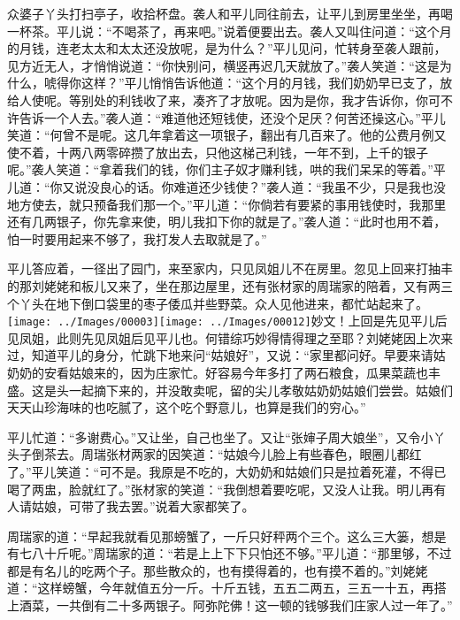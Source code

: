众婆子丫头打扫亭子，收拾杯盘。袭人和平儿同往前去，让平儿到房里坐坐，再喝一杯茶。平儿说：``不喝茶了，再来吧。''说着便要出去。袭人又叫住问道：``这个月的月钱，连老太太和太太还没放呢，是为什么？''平儿见问，忙转身至袭人跟前，见方近无人，才悄悄说道：``你快别问，横竖再迟几天就放了。''袭人笑道：``这是为什么，唬得你这样？''平儿悄悄告诉他道：``这个月的月钱，我们奶奶早已支了，放给人使呢。等别处的利钱收了来，凑齐了才放呢。因为是你，我才告诉你，你可不许告诉一个人去。''袭人道：``难道他还短钱使，还没个足厌？何苦还操这心。''平儿笑道：``何曾不是呢。这几年拿着这一项银子，翻出有几百来了。他的公费月例又使不着，十两八两零碎攒了放出去，只他这梯己利钱，一年不到，上千的银子呢。''袭人笑道：``拿着我们的钱，你们主子奴才赚利钱，哄的我们呆呆的等着。''平儿道：``你又说没良心的话。你难道还少钱使？''袭人道：``我虽不少，只是我也没地方使去，就只预备我们那一个。''平儿道：``你倘若有要紧的事用钱使时，我那里还有几两银子，你先拿来使，明儿我扣下你的就是了。''袭人道：``此时也用不着，怕一时要用起来不够了，我打发人去取就是了。''

平儿答应着，一径出了园门，来至家内，只见凤姐儿不在房里。忽见上回来打抽丰的那刘姥姥和板儿又来了，坐在那边屋里，还有张材家的周瑞家的陪着，又有两三个丫头在地下倒口袋里的枣子倭瓜并些野菜。众人见他进来，都忙站起来了。{\texttt{[image: ../Images/00003]}\texttt{[image: ../Images/00012]}\footnotesize \kaishu 妙文！上回是先见平儿后见凤姐，此则先见凤姐后见平儿也。何错综巧妙得情得理之至耶？}刘姥姥因上次来过，知道平儿的身分，忙跳下地来问``姑娘好''，又说：``家里都问好。早要来请姑奶奶的安看姑娘来的，因为庄家忙。好容易今年多打了两石粮食，瓜果菜蔬也丰盛。这是头一起摘下来的，并没敢卖呢，留的尖儿孝敬姑奶奶姑娘们尝尝。姑娘们天天山珍海味的也吃腻了，这个吃个野意儿，也算是我们的穷心。''

平儿忙道：``多谢费心。''又让坐，自己也坐了。又让``张婶子周大娘坐''，又令小丫头子倒茶去。周瑞张材两家的因笑道：``姑娘今儿脸上有些春色，眼圈儿都红了。''平儿笑道：``可不是。我原是不吃的，大奶奶和姑娘们只是拉着死灌，不得已喝了两盅，脸就红了。''张材家的笑道：``我倒想着要吃呢，又没人让我。明儿再有人请姑娘，可带了我去罢。''说着大家都笑了。

周瑞家的道：``早起我就看见那螃蟹了，一斤只好秤两个三个。这么三大篓，想是有七八十斤呢。''周瑞家的道：``若是上上下下只怕还不够。''平儿道：``那里够，不过都是有名儿的吃两个子。那些散众的，也有摸得着的，也有摸不着的。''刘姥姥道：``这样螃蟹，今年就值五分一斤。十斤五钱，五五二两五，三五一十五，再搭上酒菜，一共倒有二十多两银子。阿弥陀佛！这一顿的钱够我们庄家人过一年了。''

